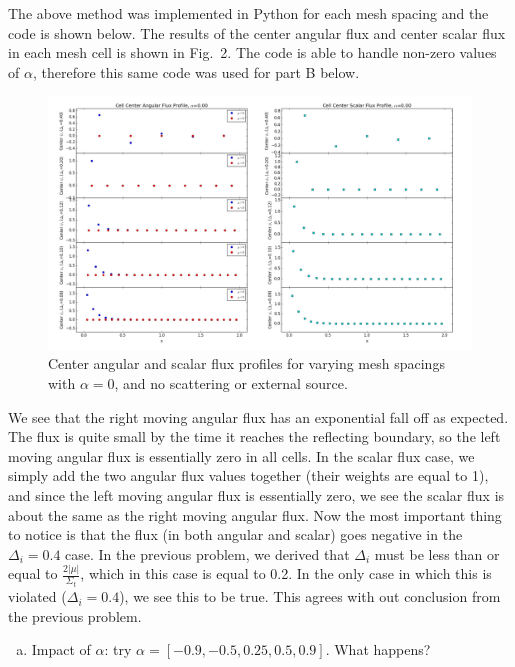 \documentclass[10pt]{article}
\begin{document}
The above method was implemented in Python for each mesh spacing and the code is shown below. The results of the center angular flux and center scalar flux in each mesh cell is shown in Fig.~2. The code is able to handle non-zero values of $\alpha$, therefore this same code was used for part B below. \\



\begin{figure}[H]
    \centering
    \includegraphics[width=\textwidth]{Figures/FluxProfile_a=0}
    \caption{Center angular and scalar flux profiles for varying mesh spacings with $\alpha = 0$, and no scattering or external source.}
    \label{fig2}
\end{figure}

We see that the right moving angular flux has an exponential fall off as expected. The flux is quite small by the time it reaches the reflecting boundary, so the left moving angular flux is essentially zero in all cells. In the scalar flux case, we simply add the two angular flux values together (their weights are equal to 1), and since the left moving angular flux is essentially zero, we see the scalar flux is about the same as the right moving angular flux. Now the most important thing to notice is that the flux (in both angular and scalar) goes negative in the $\Delta_i = 0.4$ case. In the previous problem, we derived that $\Delta_i$ must be less than or equal to $\frac{2|\mu|}{\Sigma_t}$, which in this case is equal to 0.2. In the only case in which this is violated ($\Delta_i = 0.4$), we see this to be true. This agrees with out conclusion from the previous problem.

%
%
%

\vspace{10pt}
\begin{enumerate}[(b)]
\item Impact of $\alpha$: try $\alpha = [-0.9, -0.5, 0.25, 0.5, 0.9]$. What happens?
\end{enumerate}
\end{document}
